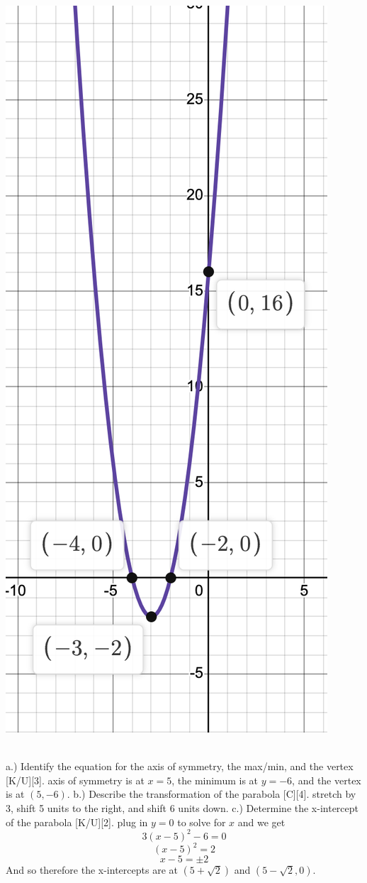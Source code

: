\documentclass{article}
\begin{document}
\begin{center}
	\includegraphics[scale=0.4]{figure8.png}
\end{center}
\vskip 1cm
\\

a.) Identify the equation for the axis of symmetry, the max/min, and the vertex [K/U][3].
\vskip 0.5cm
\textbf{\color{red}{The}} axis of symmetry is at $x=5$, the minimum is at $y=-6$, and the vertex is at $(5,-6)$.
\vskip 1cm
b.) Describe the transformation of the parabola [C][4].
\vskip 0.5cm
\textbf{\color{red}{Vertically}} stretch by 3, shift 5 units to the right, and shift 6 units down. 
\vskip 1cm
c.) Determine the x-intercept of the parabola [K/U][2].
\vskip 0.5cm 
\textbf{\color{red}{We}} plug in $y=0$ to solve for $x$ and we get 
\[
	3(x-5)^2-6=0
\]
\[
	(x-5)^2=2
\]
\[
	x-5=\pm2
\]
And so therefore the x-intercepts are at $(5+\sqrt{2})$ and $(5-\sqrt{2},0)$.
\end{document}
